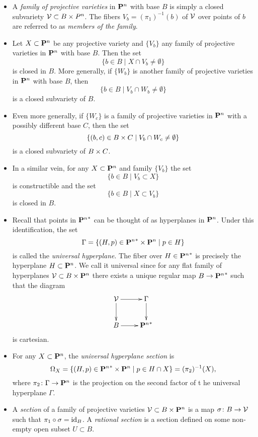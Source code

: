 \begin{itemize}
\item
  A \emph{family of projective varieties} in $\P^n$ with base $B$ is simply a closed subvariety $\Vc \subset B \x P^n$. The fibers $V_b = (\pi_1)^{-1}(b)$ of $\Vc$ over points of $b$ are referred to as \emph{members of the family}.

\item
  Let $X \subset \P^n$ be any projective variety and $\{ V_b \}$ any family of projective varieties in $\P^n$ with base $B$. Then the set
  \[
  \{ b \in B \;|\; X \cap V_b \neq \emptyset \}
  \]
  is closed in $B$. More generally, if $\{ W_b \}$ is another family of projective varieties in $\P^n$ with base $B$, then
  \[
  \{ b \in B \;|\; V_b \cap W_b \neq \emptyset \}
  \]
  is a closed subvariety of $B$.

\item
  Even more generally, if $\{ W_c \}$ is a family of projective varieties in $\P^n$ with a possibly different base $C$, then the set
  \[
  \{ (b,c) \in B \x C \;|\; V_b \cap W_c \neq \emptyset \}
  \]
  is a closed subvariety of $B \x C$.

\item
  In a similar vein, for any $X \subset \P^n$ and family $\{ V_b \}$ the set
  \[
  \{ b \in B \;|\; V_b \subset X \}
  \]
  is constructible and the set
  \[
  \{ b \in B \;|\; X \subset V_b \}
  \]
  is closed in $B$.

\item
  Recall that points in ${\P^n}^\ast$ can be thought of as hyperplanes in $\P^n$. Under this identification, the set
  \[
  \Gamma = \{ (H, p) \in {\P^n}^\ast \x \P^n \;|\; p \in H \}
  \]
  is called the \emph{universal hyperplane}. The fiber over $H \in {\P^n}^\ast$ is precisely the hyperplane $H \subset \P^n$. We call it universal since for any flat family of hyperplanes $\Vc \subset B \x \P^n$ there exists a unique regular map $B \rarr {\P^n}^\ast$ such that the diagram
  \[\xymatrix{
    \Vc \ar[r] \ar[d] & \Gamma \ar[d] \\
    B \ar[r] & {\P^n}^\ast
  }\]
  is cartesian.

\item
  For any $X \subset \P^n$, the \emph{universal hyperplane section} is
  \[
  \Omega_X = \{ (H, p) \in {\P^n}^\ast \x \P^n \;|\; p \in H \cap X \} = (\pi_2)^{-1}(X),
  \]
  where $\pi_2 \cn \Gamma \rarr \P^n$ is the projection on the second factor of t he universal hyperplane $\Gamma$.

\item
  A \emph{section} of a family of projective varieties $\Vc \subset B \x \P^n$ is a map $\sigma \cn B \rarr \Vc$ such that $\pi_1 \circ \sigma = \id_B$. A \emph{rational section} is a section defined on some non-empty open subset $U \subset B$.
\end{itemize}

